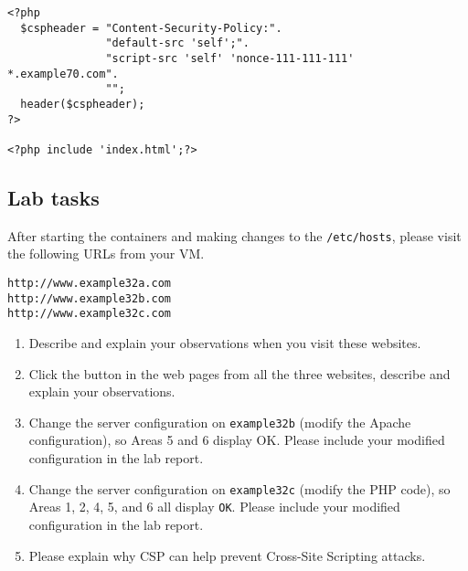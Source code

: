 \begin{lstlisting}
<?php
  $cspheader = "Content-Security-Policy:".
               "default-src 'self';".
               "script-src 'self' 'nonce-111-111-111' *.example70.com".
               "";
  header($cspheader);
?>

<?php include 'index.html';?>
\end{lstlisting}



\subsection{Lab tasks} 


After starting the containers and making changes to the \texttt{/etc/hosts}, please visit
the following URLs from your VM. 

\begin{lstlisting}
http://www.example32a.com
http://www.example32b.com
http://www.example32c.com
\end{lstlisting}

\begin{enumerate}

\item Describe and explain your observations when you visit these websites.

\item Click the button in the web pages from all the three websites, describe and 
explain your observations. 

\item Change the server configuration on \texttt{example32b} (modify the Apache 
configuration), so Areas 5 and 6 display OK. 
Please include your modified configuration in the lab report.

\item Change the server configuration on \texttt{example32c} (modify the PHP code), so 
Areas 1, 2, 4, 5, and 6 all display \texttt{OK}. 
Please include your modified configuration in the lab report.

\item Please explain why CSP can help prevent Cross-Site Scripting attacks. 

\end{enumerate}
 




